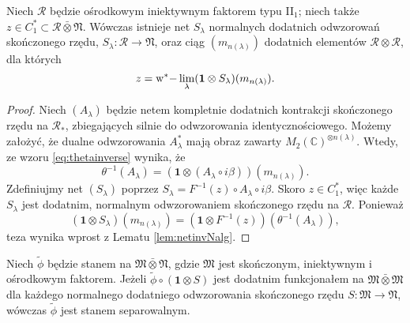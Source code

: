 \begin{Lemma}
\label{lem:netininjectivefactor}
Niech $\mathcal{R}$
będzie ośrodkowym iniektywnym faktorem typu II$\phantom{}_{1}$;
niech także $z \in C_{1}^{*} \subset \mathcal{R} \bar{\otimes} \mathfrak{N}$.
Wówczas istnieje net $S_{\lambda}$ normalnych dodatnich odwzorowań skończonego rzędu,
$S_{\lambda}: \mathcal{R} \rightarrow \mathfrak{N}$,
oraz ciąg $(m_{n(\lambda)})$ dodatnich elementów $\mathcal{R} \otimes \mathcal{R}$,
dla których
\begin{equation}
z = {\rm w^*-} \lim \limits_{\lambda}(\mathbf{1} \otimes S_{\lambda})(m_{n(\lambda)}).
\end{equation}
\end{Lemma}
\begin{proof}
Niech $(A_{\lambda})$ będzie netem kompletnie dodatnich kontrakcji
skończonego rzędu na $\mathcal{R}_{*}$,
zbiegających silnie do odwzorowania identycznościowego.
Możemy założyć, że dualne odwzorowania $A_{\lambda}^{*}$
mają obraz zawarty $M_{2}(\mathbb{C})^{\otimes n(\lambda)}$.
Wtedy, ze wzoru \eqref{eq:thetainverse} wynika, że
\begin{equation}
\theta^{-1} (A_{\lambda}) =
( \mathbf{1} \otimes (A_{\lambda} \circ i\beta)) (m_{n(\lambda)}).
\end{equation}
Zdefiniujmy net $(S_{\lambda})$ poprzez
$S_{\lambda} = F^{-1}(z) \circ A_{\lambda} \circ i\beta$.
Skoro $z \in C_{1}^{*}$,
więc każde $S_{\lambda}$ jest dodatnim, normalnym odwzorowaniem skończonego rzędu
na $\mathcal{R}$.
Ponieważ
\begin{equation}
(\mathbf{1} \otimes S_{\lambda}) (m_{n(\lambda)}) =
(\mathbf{1} \otimes F^{-1}(z)) (\theta^{-1}(A_{\lambda})),
\end{equation}
teza wynika wprost z Lematu \ref{lem:netinvNalg}.
\end{proof}
\begin{Lemma}
\label{lem:step2}
Niech $\tilde{\phi}$ będzie stanem na
$\mathfrak{M} \bar{\otimes} \mathfrak{N}$,
gdzie $\mathfrak{M}$ jest skończonym, iniektywnym i ośrodkowym faktorem.
Jeżeli $\tilde{\phi} \circ ( \mathbf{1} \otimes S)$
jest dodatnim funkcjonałem na
$\mathfrak{M} \bar{\otimes} \mathfrak{M}$
dla każdego normalnego dodatniego odwzorowania skończonego rzędu
$S: \mathfrak{M} \rightarrow \mathfrak{N}$,
wówczas $\tilde{\phi}$ jest stanem separowalnym.
\end{Lemma}

